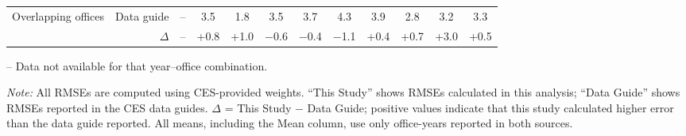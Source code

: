 \begin{table}[p]
{\begin{threeparttable}
\begin{tabular}{lrcccccccccc}
Overlapping offices & Data guide & -- & 3.5 & 1.8 & 3.5 & 3.7 & 4.3 & 3.9 & 2.8 & 3.2 & 3.3 \\
 & $\Delta$ & -- & +0.8 & +1.0 & $-$0.6 & $-$0.4 & $-$1.1 & +0.4 & +0.7 & +3.0 & +0.5 \\
\bottomrule
\end{tabular}
\begin{tablenotes}
\footnotesize
\item -- Data not available for that year--office combination.
\item \textit{Note:} All RMSEs are computed using CES-provided weights. ``This Study'' shows RMSEs calculated in this analysis; ``Data Guide'' shows RMSEs reported in the CES data guides. $\Delta$ = This Study $-$ Data Guide; positive values indicate that this study calculated higher error than the data guide reported. All means, including the Mean column, use only office-years reported in both sources.
\end{tablenotes}
\end{threeparttable}%
}
\end{table}